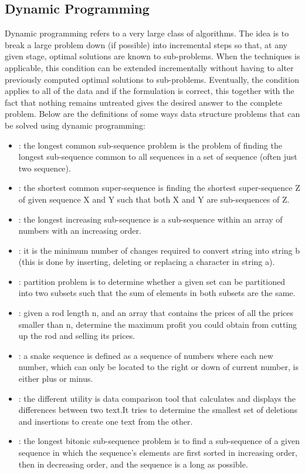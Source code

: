 \documentclass[12pt]{report}
\begin{document}
	\subsection{Dynamic Programming}
	Dynamic programming refers to a very large class of algorithms. The idea is to break a large problem down (if possible) into incremental steps so that, at any given stage, optimal solutions are known to sub-problems. When the techniques is applicable, this condition can be extended incrementally without having to alter previously computed optimal solutions to sub-problems. Eventually, the condition applies to all of the data and if the formulation is correct, this together with the fact that nothing remains untreated gives the desired answer to the complete problem. Below are the definitions of some ways data structure problems that can be solved using dynamic programming:
	\begin{itemize}
		\item
		: the longest common sub-sequence problem is the problem of finding the longest sub-sequence common to all sequences in a set of sequence (often just two sequence).
		\item
		: the shortest common super-sequence is finding the shortest super-sequence Z of given sequence X and Y such that both   X and Y are sub-sequences of Z.
		\item
		: the longest increasing sub-sequence is a sub-sequence within an array of numbers with an increasing order. 
		\item
		: it is the minimum number of changes required to convert string into string b (this is done by inserting, deleting or replacing a character in string a).
		\item
		: partition problem is to determine whether a given set can be partitioned into two subsets such that the sum of elements in both subsets are the same. 
		\item
		: given a rod length n, and an array that contains the prices of all the prices smaller than n, determine the maximum profit you could obtain from cutting up the rod and selling its prices.
		\item
		: a snake sequence is defined as a sequence of numbers where each new number, which can only be located to the right or down of current number, is either plus or minus. 
		\item
		: the different utility is data comparison tool that calculates and displays the differences between two text.It tries to determine the smallest set of deletions and insertions to create one text from the other. 
		\item
		: the longest bitonic sub-sequence problem is to find a sub-sequence of a given sequence in which the sequence's elements are first sorted in increasing order, then in decreasing order, and the sequence is a long as possible.
	\end{itemize}
	\item
\end{document}
